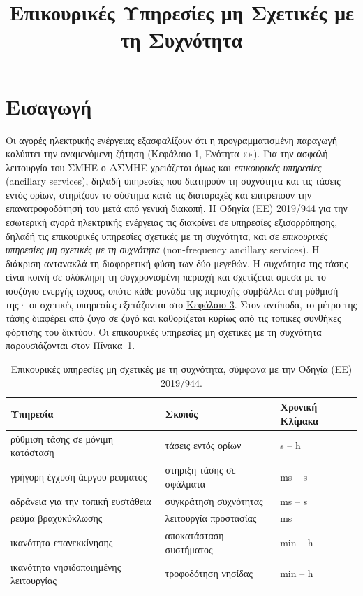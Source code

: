 \title{Επικουρικές Υπηρεσίες μη Σχετικές με τη Συχνότητα}

\section{Εισαγωγή}
\label{kef-02-theoria}
Οι αγορές ηλεκτρικής ενέργειας εξασφαλίζουν ότι η προγραμματισμένη παραγωγή καλύπτει την
αναμενόμενη ζήτηση (Κεφάλαιο 1, Ενότητα «»). Για την ασφαλή λειτουργία του
ΣΜΗΕ ο ΔΣΜΗΕ χρειάζεται όμως και \emph{επικουρικές υπηρεσίες} (ancillary services), δηλαδή
υπηρεσίες που διατηρούν τη συχνότητα και τις τάσεις εντός ορίων, στηρίζουν το σύστημα κατά τις
διαταραχές και επιτρέπουν την επανατροφοδότησή του μετά από γενική διακοπή. Η Οδηγία (ΕΕ)
2019/944 για την εσωτερική αγορά ηλεκτρικής ενέργειας τις διακρίνει σε υπηρεσίες εξισορρόπησης,
δηλαδή τις επικουρικές υπηρεσίες σχετικές με τη συχνότητα, και σε \emph{επικουρικές υπηρεσίες
μη σχετικές με τη συχνότητα} (non-frequency ancillary services). Η διάκριση αντανακλά τη
διαφορετική φύση των δύο μεγεθών. Η συχνότητα της τάσης είναι κοινή σε ολόκληρη τη
συγχρονισμένη περιοχή και σχετίζεται άμεσα με το ισοζύγιο ενεργής ισχύος, οπότε κάθε μονάδα της
περιοχής συμβάλλει στη ρύθμισή της· οι σχετικές υπηρεσίες εξετάζονται στο
\hyperref[kef-03-theoria]{Κεφάλαιο 3}. Στον αντίποδα, το μέτρο της τάσης διαφέρει από ζυγό σε
ζυγό και καθορίζεται κυρίως από τις τοπικές συνθήκες φόρτισης του δικτύου. Οι επικουρικές
υπηρεσίες μη σχετικές με τη συχνότητα παρουσιάζονται στον Πίνακα~\ref{tab:nfas}.

\begin{table}[!htbp]
\centering
\begin{tabular}{lll}
\hline
\textbf{Υπηρεσία} & \textbf{Σκοπός} & \textbf{Χρονική Κλίμακα} \\
\hline
ρύθμιση τάσης σε μόνιμη κατάσταση & τάσεις εντός ορίων & s -- h \\
γρήγορη έγχυση άεργου ρεύματος & στήριξη τάσης σε σφάλματα & ms -- s \\
αδράνεια για την τοπική ευστάθεια & συγκράτηση συχνότητας & ms -- s \\
ρεύμα βραχυκύκλωσης & λειτουργία προστασίας & ms \\
ικανότητα επανεκκίνησης & αποκατάσταση συστήματος & min -- h \\
ικανότητα νησιδοποιημένης λειτουργίας & τροφοδότηση νησίδας & min -- h \\
\hline
\end{tabular}
\caption{Επικουρικές υπηρεσίες μη σχετικές με τη συχνότητα, σύμφωνα με την Οδηγία (ΕΕ)
2019/944.}
\label{tab:nfas}
\end{table}


